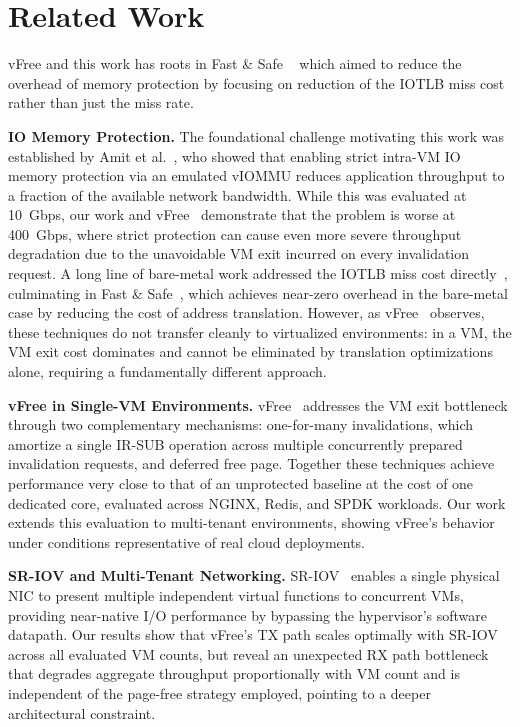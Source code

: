 \section{Related Work}
\label{sec:related_work}

vFree \cite{vFree} and this work has roots in Fast \& Safe ~\cite{Rubin2024FastSafe} which aimed to reduce the overhead of memory protection by focusing on reduction of the IOTLB miss cost rather than just the miss rate. 

\textbf{IO Memory Protection.}
The foundational challenge motivating this work was established by Amit et al.~\cite{Amit2011vIOMMU}, who showed that enabling strict intra-VM IO memory protection via an emulated vIOMMU reduces application throughput to a fraction of the available network bandwidth. While this was evaluated at 10~Gbps, our work and vFree~\cite{vFree} demonstrate that the problem is worse at 400~Gbps, where strict protection can cause even more severe throughput degradation due to the unavoidable VM exit incurred on every invalidation request. A long line of bare-metal work addressed the IOTLB miss cost directly~\cite{RajapakshaIOMMU, markuze2018damn, peleg2015utilizing, Markuze2016true}, culminating in Fast \& Safe~\cite{Rubin2024FastSafe}, which achieves near-zero overhead in the bare-metal case by reducing the cost of address translation. However, as vFree~\cite{vFree} observes, these techniques do not transfer cleanly to virtualized environments: in a VM, the VM exit cost dominates and cannot be eliminated by translation optimizations alone, requiring a fundamentally different approach.

\textbf{vFree in Single-VM Environments.}
vFree~\cite{vFree} addresses the VM exit bottleneck through two complementary mechanisms: one-for-many invalidations, which amortize a single IR-SUB operation across multiple concurrently prepared invalidation requests, and deferred free page. Together these techniques achieve performance very close to that of an unprotected baseline at the cost of one dedicated core, evaluated across NGINX, Redis, and SPDK workloads. Our work extends this evaluation to multi-tenant environments, showing vFree's behavior under conditions representative of real cloud deployments.

\textbf{SR-IOV and Multi-Tenant Networking.}
SR-IOV~\cite{amd_sriov_mxgpu, ms_sriov_overview, intel_sriov_ethernet} enables a single physical NIC to present multiple independent virtual functions to concurrent VMs, providing near-native I/O performance by bypassing the hypervisor's software datapath. Our results show that vFree's TX path scales optimally with SR-IOV across all evaluated VM counts, but reveal an unexpected RX path bottleneck that degrades aggregate throughput proportionally with VM count and is independent of the page-free strategy employed, pointing to a deeper architectural constraint.